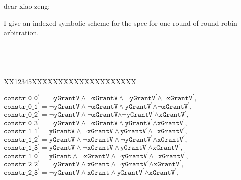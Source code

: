 \documentclass{article}
\newlength{\fminilength}
\newenvironment{fmini}[1][\linewidth]
  {\setlength{\fminilength}{#1\fboxsep-2\fboxrule}%
   \vspace{2ex}\noindent\begin{lrbox}{\fminibox}\begin{minipage}{\fminilength}%
   \mbox{ }\hfill\vspace{-2.5ex}}%
  {\end{minipage}\end{lrbox}\vspace{1ex}\hspace{0ex}%
   \framebox{\usebox{\fminibox}}}
\newenvironment{specification}
{\noindent\footnotesize\tt\begin{fmini}\begin{tabbing}X\=X12345\=XXXX\=XXXX\=XXXX\=XXXX\=XXXX
\=\+\kill} {\end{tabbing}\normalfont\end{fmini}}
\begin{document}
dear xiao zeng:

I give an indexed symbolic scheme for the spec for one round of
round-robin arbitration.

\begin{specification}



$\mathtt{constr\_0\_0}^{\prime }\mathtt{=\lnot yGrantV\wedge \lnot
xGrantV\wedge \lnot yGrantV}^{\prime }\mathtt{\wedge \lnot xGrantV}^{\prime
},$\\

$\mathtt{constr\_0\_1}^{\prime }\mathtt{=\lnot yGrantV\wedge \lnot
xGrantV\wedge yGrantV}^{\prime }\mathtt{\wedge \lnot xGrantV}^{\prime }%
\mathtt{,}$\\

$\mathtt{constr\_0\_2}^{\prime }\mathtt{=\lnot yGrantV\wedge \lnot xGrantV%
\mathtt{\wedge \mathtt{\lnot }yGrantV}^{\prime }\mathtt{\wedge xGrantV}%
^{\prime },}$\\

$\mathtt{constr\_0\_3}^{\prime }\mathtt{=\lnot yGrantV\wedge \lnot
xGrantV\wedge \mathtt{yGrantV}^{\prime }\mathtt{\wedge xGrantV}^{\prime },}$%
\\

$\mathtt{constr\_1\_1}^{\prime }\mathtt{=yGrantV\wedge \lnot xGrantV\wedge
yGrantV}^{\prime }\mathtt{\wedge \lnot xGrantV}^{\prime }\mathtt{,}$\\

$\mathtt{constr\_1\_2}^{\prime }\mathtt{=yGrantV\wedge \lnot xGrantV\wedge
\mathtt{\mathtt{\lnot }yGrantV}^{\prime }\mathtt{\wedge xGrantV}^{\prime },}$%
\\

$\mathtt{constr\_1\_3}^{\prime }\mathtt{=yGrantV\wedge \lnot xGrantV\wedge
\mathtt{yGrantV}^{\prime }\mathtt{\wedge xGrantV}^{\prime },}$\\

$\mathtt{constr\_1\_0}^{\prime }\mathtt{=yGrant\wedge \lnot xGrantV\wedge
\mathtt{\lnot yGrantV}^{\prime }\mathtt{\wedge \lnot xGrantV}^{\prime },}$%
\\

$\mathtt{constr\_2\_2}^{\prime }\mathtt{=\lnot yGrantV\wedge xGrant\wedge
\mathtt{\mathtt{\lnot }yGrantV}^{\prime }\mathtt{\wedge xGrantV}^{\prime },}$%
\\

$\mathtt{constr\_2\_3}^{\prime }\mathtt{=\lnot yGrantV\wedge xGrant\wedge
\mathtt{yGrantV}^{\prime }\mathtt{\wedge xGrantV}^{\prime },}$\\


\end{specification}
\end{document}
